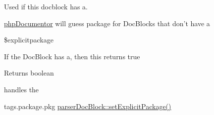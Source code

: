 \-Used if this docblock has a.

\hyperlink{namespacephp_documentor}{php\-Documentor} will guess package for \-Doc\-Blocks that don't have a

\$explicitpackage

\-If the \-Doc\-Block has a, then this returns true \begin{DoxyReturn}{\-Returns}
boolean
\end{DoxyReturn}
handles the

tags.\-package.\-pkg  \hyperlink{classparser_doc_block_a20a0597df891f512b70971e25f59397c}{parser\-Doc\-Block\-::set\-Explicit\-Package()} 
